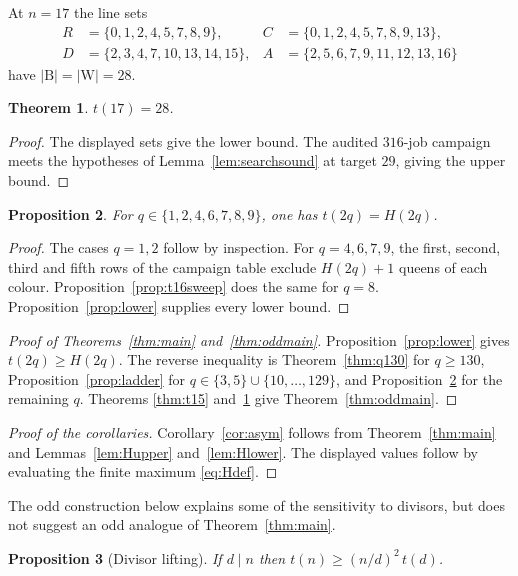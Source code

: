 \documentclass[11pt]{amsart}
\newtheorem{theorem}{Theorem}
\newtheorem{proposition}[theorem]{Proposition}
\theoremstyle{definition}
\theoremstyle{remark}
\newcommand{\Bl}{\mathrm{B}}
\newcommand{\Wh}{\mathrm{W}}
\begin{document}
At $n=17$ the line sets
\[
\begin{aligned}
R&=\{0,1,2,4,5,7,8,9\},&
C&=\{0,1,2,4,5,7,8,9,13\},\\
D&=\{2,3,4,7,10,13,14,15\},&
A&=\{2,5,6,7,9,11,12,13,16\}
\end{aligned}
\]
have $|\Bl|=|\Wh|=28$.

\begin{theorem}\label{thm:t17}
$t(17)=28$.
\end{theorem}

\begin{proof}
The displayed sets give the lower bound.  The audited $316$-job campaign
meets the hypotheses of Lemma~\ref{lem:searchsound} at target $29$, giving
the upper bound.
\end{proof}

\begin{proposition}\label{prop:small-even}
For $q\in\{1,2,4,6,7,8,9\}$, one has $t(2q)=H(2q)$.
\end{proposition}

\begin{proof}
The cases $q=1,2$ follow by inspection.  For $q=4,6,7,9$, the first,
second, third and fifth rows of the campaign table exclude
$H(2q)+1$ queens of each colour.  Proposition~\ref{prop:t16sweep} does the
same for $q=8$.  Proposition~\ref{prop:lower} supplies every lower bound.
\end{proof}

\begin{proof}[Proof of Theorems~\ref{thm:main} and~\ref{thm:oddmain}]
Proposition~\ref{prop:lower} gives $t(2q)\ge H(2q)$.  The reverse inequality
is Theorem~\ref{thm:q130} for $q\ge130$, Proposition~\ref{prop:ladder} for
$q\in\{3,5\}\cup\{10,\ldots,129\}$, and
Proposition~\ref{prop:small-even} for the remaining $q$.  Theorems
\ref{thm:t15} and~\ref{thm:t17} give Theorem~\ref{thm:oddmain}.
\end{proof}

\begin{proof}[Proof of the corollaries]
Corollary~\ref{cor:asym} follows from Theorem~\ref{thm:main} and
Lemmas~\ref{lem:Hupper} and~\ref{lem:Hlower}.  The displayed values follow
by evaluating the finite maximum \eqref{eq:Hdef}.
\end{proof}

The odd construction below explains some of the sensitivity to divisors, but
does not suggest an odd analogue of Theorem~\ref{thm:main}.

\begin{proposition}[Divisor lifting]\label{prop:lift}
If $d\mid n$ then $t(n)\ge(n/d)^2\,t(d)$.
\end{proposition}
\end{document}

